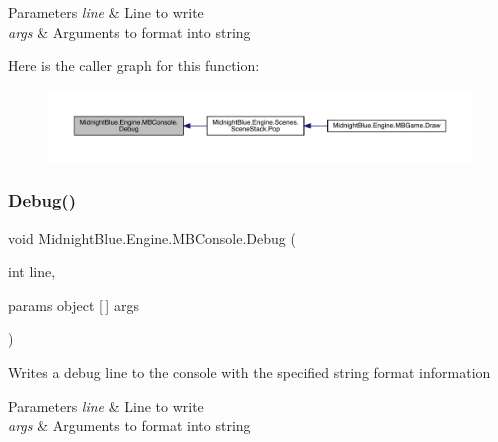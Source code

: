 \begin{DoxyParams}{Parameters}
{\em line} & Line to write\\
\hline
{\em args} & Arguments to format into string\\
\hline
\end{DoxyParams}
Here is the caller graph for this function\+:
\nopagebreak
\begin{figure}[H]
\begin{center}
\leavevmode
\includegraphics[width=350pt]{class_midnight_blue_1_1_engine_1_1_m_b_console_a99525d45031da45b97230010d767eb0a_icgraph}
\end{center}
\end{figure}
\hypertarget{class_midnight_blue_1_1_engine_1_1_m_b_console_a335cd63ac3668739453d757c82f107bb}{}\label{class_midnight_blue_1_1_engine_1_1_m_b_console_a335cd63ac3668739453d757c82f107bb} 
\subsubsection{\texorpdfstring{Debug()}{Debug()}\hspace{0.1cm}{\footnotesize\ttfamily [2/4]}}
{\footnotesize\ttfamily void Midnight\+Blue.\+Engine.\+M\+B\+Console.\+Debug (\begin{DoxyParamCaption}\item[{int}]{line,  }\item[{params object \mbox{[}$\,$\mbox{]}}]{args }\end{DoxyParamCaption})\hspace{0.3cm}{\ttfamily [inline]}}



Writes a debug line to the console with the specified string format information 


\begin{DoxyParams}{Parameters}
{\em line} & Line to write\\
\hline
{\em args} & Arguments to format into string\\
\hline
\end{DoxyParams}
\hypertarget{class_midnight_blue_1_1_engine_1_1_m_b_console_a42e214eb86728d3c7d9628fb11292854}{}\label{class_midnight_blue_1_1_engine_1_1_m_b_console_a42e214eb86728d3c7d9628fb11292854} 
